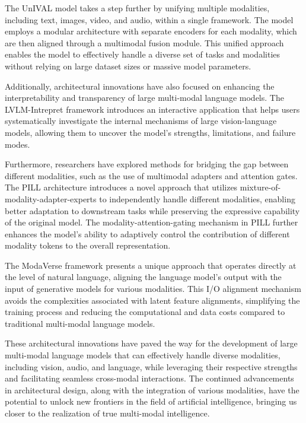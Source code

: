 \documentclass[11pt]{article}
\begin{document}
The UnIVAL model \cite{ref10} takes a step further by unifying multiple modalities, including text, images, video, and audio, within a single framework. The model employs a modular architecture with separate encoders for each modality, which are then aligned through a multimodal fusion module. This unified approach enables the model to effectively handle a diverse set of tasks and modalities without relying on large dataset sizes or massive model parameters.

Additionally, architectural innovations have also focused on enhancing the interpretability and transparency of large multi-modal language models. The LVLM-Intrepret framework \cite{ref29} introduces an interactive application that helps users systematically investigate the internal mechanisms of large vision-language models, allowing them to uncover the model's strengths, limitations, and failure modes.

Furthermore, researchers have explored methods for bridging the gap between different modalities, such as the use of multimodal adapters and attention gates. The PILL architecture \cite{ref30} introduces a novel approach that utilizes mixture-of-modality-adapter-experts to independently handle different modalities, enabling better adaptation to downstream tasks while preserving the expressive capability of the original model. The modality-attention-gating mechanism in PILL further enhances the model's ability to adaptively control the contribution of different modality tokens to the overall representation.

The ModaVerse framework \cite{ref16} presents a unique approach that operates directly at the level of natural language, aligning the language model's output with the input of generative models for various modalities. This I/O alignment mechanism avoids the complexities associated with latent feature alignments, simplifying the training process and reducing the computational and data costs compared to traditional multi-modal language models.

These architectural innovations have paved the way for the development of large multi-modal language models that can effectively handle diverse modalities, including vision, audio, and language, while leveraging their respective strengths and facilitating seamless cross-modal interactions. The continued advancements in architectural design, along with the integration of various modalities, have the potential to unlock new frontiers in the field of artificial intelligence, bringing us closer to the realization of true multi-modal intelligence.
\end{document}

